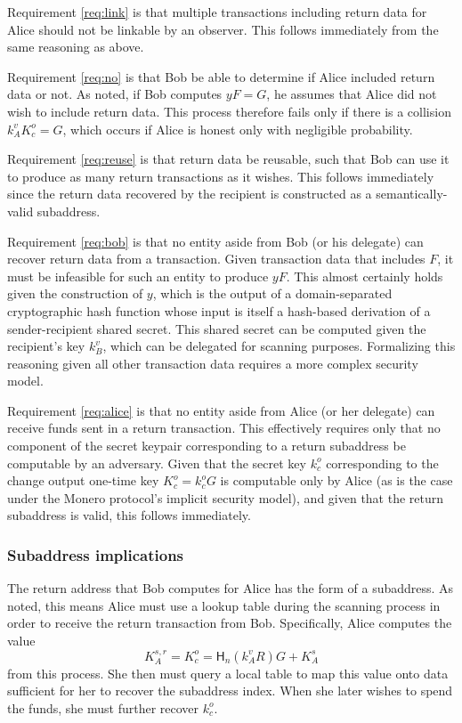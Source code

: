 \documentclass{article}
\newcommand{\hash}{\mathsf{H}_n}
\begin{document}
Requirement \ref{req:link} is that multiple transactions including return data for Alice should not be linkable by an observer.
This follows immediately from the same reasoning as above.

Requirement \ref{req:no} is that Bob be able to determine if Alice included return data or not.
As noted, if Bob computes $y F = G$, he assumes that Alice did not wish to include return data.
This process therefore fails only if there is a collision $k_A^v K_c^o = G$, which occurs if Alice is honest only with negligible probability.

Requirement \ref{req:reuse} is that return data be reusable, such that Bob can use it to produce as many return transactions as it wishes.
This follows immediately since the return data recovered by the recipient is constructed as a semantically-valid subaddress.

Requirement \ref{req:bob} is that no entity aside from Bob (or his delegate) can recover return data from a transaction.
Given transaction data that includes $F$, it must be infeasible for such an entity to produce $y F$.
This almost certainly holds given the construction of $y$, which is the output of a domain-separated cryptographic hash function whose input is itself a hash-based derivation of a sender-recipient shared secret.
This shared secret can be computed given the recipient's key $k_B^v$, which can be delegated for scanning purposes.
Formalizing this reasoning given all other transaction data requires a more complex security model.

Requirement \ref{req:alice} is that no entity aside from Alice (or her delegate) can receive funds sent in a return transaction.
This effectively requires only that no component of the secret keypair corresponding to a return subaddress be computable by an adversary.
Given that the secret key $k_c^o$ corresponding to the change output one-time key $K_c^o = k_c^o G$ is computable only by Alice (as is the case under the Monero protocol's implicit security model), and given that the return subaddress is valid, this follows immediately.


\subsubsection{Subaddress implications}

The return address that Bob computes for Alice has the form of a subaddress.
As noted, this means Alice must use a lookup table during the scanning process in order to receive the return transaction from Bob.
Specifically, Alice computes the value
$$K_A^{s,r} = K_c^o = \hash(k_A^v R)G + K_A^s$$
from this process.
She then must query a local table to map this value onto data sufficient for her to recover the subaddress index.
When she later wishes to spend the funds, she must further recover $k_c^o$.
\end{document}
